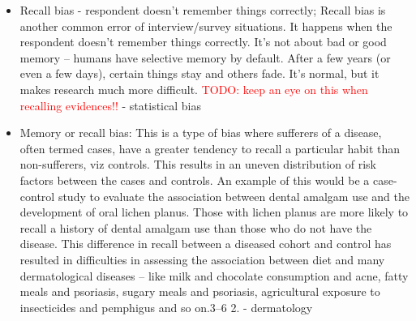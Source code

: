 \documentclass[12pt, a4paper, oneside]{book}   	%
\renewcommand{\todo}[1]{\textcolor{red}{TODO: #1}}
\newif\ifrawcitationactive
\newcommand{\rawcitationend}{\color{black}\rawcitationactivefalse}
\newcommand{\rawcitationusedend}{%
	\ifrawcitationactive
	\color{purple}  %
	\else
	\color{black}  %
	\fi
}
\begin{document}
\begin{itemize}
				\item Recall bias - respondent doesn't remember things correctly; Recall bias is another common error of interview/survey situations. It happens when the respondent doesn’t remember things correctly. It’s not about bad or good memory – humans have selective memory by default. After a few years (or even a few days), certain things stay and others fade. It’s normal, but it makes research much more difficult. \todo{keep an eye on this when recalling evidences!!}
				\autocites{Mester_2022}{Mester_2017} - statistical bias
				\item Memory or recall bias: This is a type of bias where sufferers of a disease, often termed cases, have a greater tendency to recall a particular habit than non-sufferers, viz controls. This results in an uneven distribution of risk factors between the cases and controls. An example of this would be a case-control study to evaluate the association between dental amalgam use and the development of oral lichen planus. Those with lichen planus are more likely to recall a history of dental amalgam use than those who do not have the disease. This difference in recall between a diseased cohort and control has resulted in difficulties in assessing the association between diet and many dermatological diseases – like milk and chocolate consumption and acne, fatty meals and psoriasis, sugary meals and psoriasis, agricultural exposure to insecticides and pemphigus and so on.3–6 2. \autocite{Chakraborty_2024} - dermatology
				
				\rawcitationusedend
			\end{itemize}
			\rawcitationend
			
\end{document}
